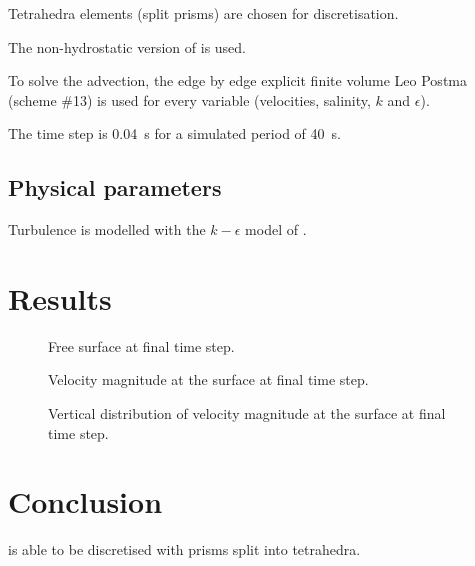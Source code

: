 Tetrahedra elements (split prisms) are chosen for discretisation.

The non-hydrostatic version of  is used.

To solve the advection, the edge by edge explicit finite volume Leo Postma
(scheme \#13) is used for every variable (velocities, salinity, $k$ and
$\epsilon$).

The time step is 0.04~s for a simulated period of 40~s.

\subsection{Physical parameters}

Turbulence is modelled with the $k-\epsilon$ model of .

\section{Results}

\begin{figure}[H]
  \centering
  \caption{Free surface at final time step.}
  \label{t3d:tetra:FreeSurf}
\end{figure}

\begin{figure}[H]
  \centering
  \caption{Velocity magnitude at the surface at final time step.}
  \label{t3d:tetra:Velo}
\end{figure}

\begin{figure}[H]
  \centering
  \caption{Vertical distribution of velocity magnitude at the surface at final time step.}
  \label{t3d:tetra:VeloV}
\end{figure}

\section{Conclusion}

 is able to be discretised with prisms split into tetrahedra.
